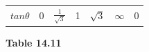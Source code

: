 {{\begin{center}
\begin{tabular}[t]{|l|l|l|l|l|l|l|}
                  $tan\theta $
                 &
        0 &
                  $\frac{1}{\sqrt{3}}$
                 &
        1 &
                  $\sqrt{3}$
                 &
                  $\infty $
                 &
        0%
     \tabularnewline\cline{1-1}\cline{2-2}\cline{3-3}\cline{4-4}\cline{5-5}\cline{6-6}\cline{7-7}
    \end{tabular}
      \end{center}
    \begin{center}{\small\bfseries Table 14.11}\end{center}
          }{ %
        \begin{center}
      \label{m39414*id89593}
    \noindent
      \tablelasttail{}
      \begin{xtabular}[t]{|l|l|l|l|l|l|l|}\hline

\end{xtabular}
\end{center}}}
